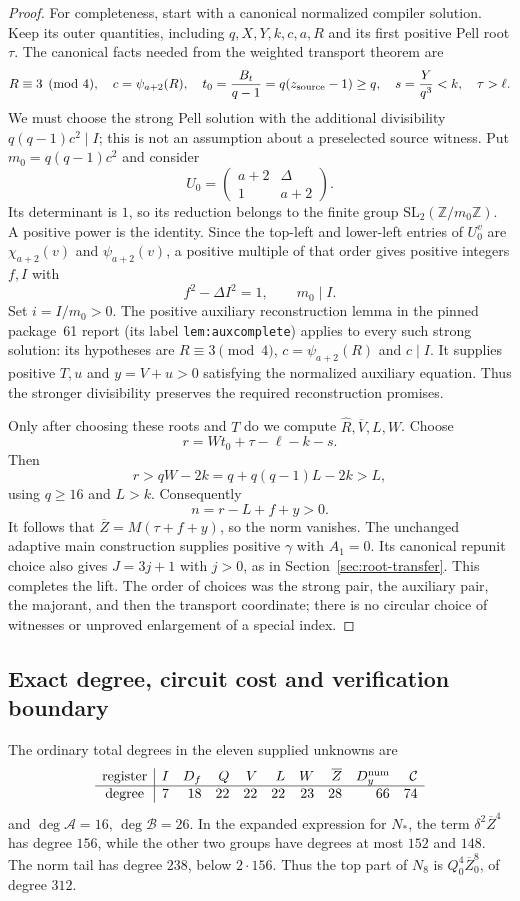 \begin{proof}
For completeness, start with a canonical normalized compiler solution.
Keep its outer quantities, including $q,X,Y,k,c,a,R$ and its first
positive Pell root $\tau$. The canonical facts needed from the weighted
transport theorem are
\[
 R\equiv3\pmod4,\quad c=\psi_{a+2}(R),\quad
 t_0=\frac{B_t}{q-1}=q(z_{\rm source}-1)\ge q,
 \quad s=\frac{Y}{q^3}<k,\quad \tau>\ell.
\]
We must choose the strong Pell solution with the additional divisibility
$q(q-1)c^2\mid I$; this is not an assumption about a preselected source
witness. Put $m_0=q(q-1)c^2$ and consider
\[
 U_0=\begin{pmatrix}a+2&\Delta\\1&a+2\end{pmatrix}.
\]
Its determinant is $1$, so its reduction belongs to the finite group
$\mathrm{SL}_2(\mathbb Z/m_0\mathbb Z)$. A positive power is the
identity. Since the top-left and lower-left entries of $U_0^v$ are
$\chi_{a+2}(v)$ and $\psi_{a+2}(v)$, a positive multiple of that order
gives positive integers $f,I$ with
\[
 f^2-\Delta I^2=1,\qquad m_0\mid I.
\]
Set $i=I/m_0>0$. The positive auxiliary reconstruction lemma in the
pinned package~61 report (its label \texttt{lem:auxcomplete}) applies to
every such strong solution: its hypotheses are $R\equiv3\pmod4$,
$c=\psi_{a+2}(R)$ and $c\mid I$. It supplies positive $T,u$ and
$y=V+u>0$ satisfying the normalized auxiliary equation. Thus the stronger
divisibility preserves the required reconstruction promises.

Only after choosing these roots and $T$ do we compute
$\widehat R,\overline V,L,W$. Choose
\[
 r=Wt_0+\tau-\ell-k-s.
\]
Then
\[
 r>qW-2k=q+q(q-1)L-2k>L,
\]
using $q\ge16$ and $L>k$. Consequently
\[
 n=r-L+f+y>0.
\]
It follows that $\overline Z=M(\tau+f+y)$, so the norm vanishes.
The unchanged adaptive main construction supplies positive $\gamma$
with $A_1=0$. Its canonical repunit choice also gives $J=3j+1$ with
$j>0$, as in Section~\ref{sec:root-transfer}. This completes the lift.
The order of choices was the strong pair, the auxiliary pair, the
majorant, and then the transport coordinate; there is no circular
choice of witnesses or unproved enlargement of a special index.
\end{proof}

\subsection{Exact degree, circuit cost and verification boundary}

The ordinary total degrees in the eleven supplied unknowns are
\[
\begin{array}{c|rrrrrrrrr}
\text{register}&I&D_f&Q&V&L&W&\overline Z&D_y^{\rm num}&\mathcal C\\\hline
\text{degree}&7&18&22&22&22&23&28&66&74
\end{array}
\]
and $\deg\mathcal A=16$, $\deg\mathcal B=26$.
In the expanded expression for $N_*$, the term
$\delta^2\overline Z^4$ has degree $156$, while the other two groups
have degrees at most $152$ and $148$. The norm tail has degree $238$,
below $2\cdot156$. Thus the top part of $N_8$ is
$Q_0^4\overline Z_0^8$, of degree $312$.


